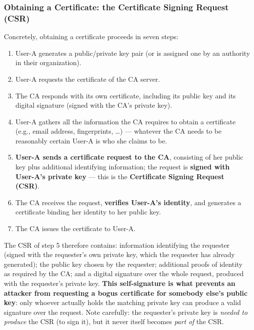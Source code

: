 \documentclass[12pt, a4paper]{article}
\begin{document}
\subsubsection{Obtaining a Certificate: the Certificate Signing Request (CSR)}
Concretely, obtaining a certificate proceeds in seven steps:
\begin{enumerate}
    \item User-A generates a public/private key pair (or is assigned one by an authority in their organization).
    \item User-A requests the certificate of the CA server.
    \item The CA responds with its own certificate, including its public key and its digital signature (signed with the CA's private key).
    \item User-A gathers all the information the CA requires to obtain a certificate (e.g., email address, fingerprints, \dots) --- whatever the CA needs to be reasonably certain User-A is who she claims to be.
    \item \textbf{User-A sends a certificate request to the CA}, consisting of her public key plus additional identifying information; the request is \textbf{signed with User-A's private key} --- this is the \textbf{Certificate Signing Request (CSR)}.
    \item The CA receives the request, \textbf{verifies User-A's identity}, and generates a certificate binding her identity to her public key.
    \item The CA issues the certificate to User-A.
\end{enumerate}
The CSR of step 5 therefore contains: information identifying the requester (signed with the requester's own private key, which the requester has already generated); the public key chosen by the requester; additional proofs of identity as required by the CA; and a digital signature over the whole request, produced with the requester's private key. \textcolor{red!70!black}{\textbf{This self-signature is what prevents an attacker from requesting a bogus certificate for somebody else's public key}}: only whoever actually holds the matching private key can produce a valid signature over the request. Note carefully: the requester's private key is \emph{needed to produce} the CSR (to sign it), but it never itself becomes \emph{part of} the CSR.
\end{document}
